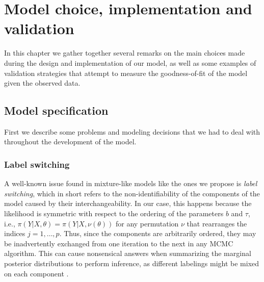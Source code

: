 %
%

\chapter{Model choice, implementation and validation}\label{ch:model-choice}

In this chapter we gather together several remarks on the main choices made during the design and implementation of our model, as well as some examples of validation strategies that attempt to measure the goodness-of-fit of the model given the observed data.

\section{Model specification}

First we describe some problems and modeling decisions that we had to deal with throughout the development of the model.

\subsection*{Label switching}

A well-known issue found in mixture-like models like the ones we propose is \textit{label switching}, which in short refers to the non-identifiability of the components of the model caused by their interchangeability. In our case, this happens because the likelihood is symmetric with respect to the ordering of the parameters \(b\) and \(\tau\), i.e., \(\pi(Y|X,\theta)=\pi(Y|X, \nu(\theta))\) for any permutation \(\nu\) that rearranges the indices \(j=1,\dots, p\). Thus, since the components are arbitrarily ordered, they may be inadvertently exchanged from one iteration to the next in any MCMC algorithm. This can cause nonsensical answers when summarizing the marginal posterior distributions to perform inference, as different labelings might be mixed on each component \citep{stephens2000dealing}.


